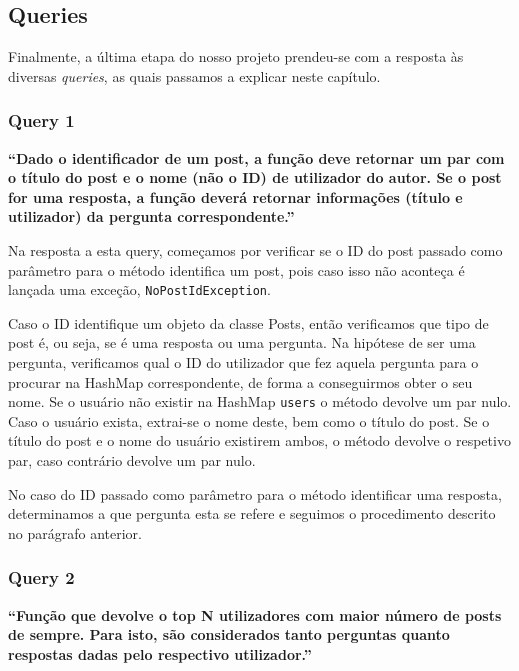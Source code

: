 \documentclass[a4paper]{article}
\begin{document}
\subsection{Queries}
\label{sec:queries}

Finalmente, a última etapa do nosso projeto prendeu-se com a resposta às diversas
\textit{queries}, as quais passamos a explicar neste capítulo.


\subsubsection*{Query 1}
\label{sec:query1}

\textbf{“Dado o identificador de um post, a função deve retornar
um par com o título do post e o nome (não o ID) de utilizador do autor. Se o post
for uma resposta, a função deverá retornar informações (título e utilizador)
da pergunta correspondente.”} \par

\vspace{0.1cm}

Na resposta a esta query, começamos por verificar se o ID do post passado como
parâmetro  para o método identifica um post, pois caso isso não aconteça é lançada
uma exceção, \texttt{NoPostIdException}. \par
Caso o ID identifique um objeto da classe Posts, então verificamos que tipo de post
é, ou seja, se é uma resposta ou uma pergunta.
Na hipótese de ser uma pergunta, verificamos qual o ID do utilizador que fez aquela
pergunta para o procurar na HashMap correspondente, de forma a conseguirmos obter
o seu nome. Se o usuário não existir na HashMap \texttt{users} o método devolve um
par nulo. Caso o usuário exista, extrai-se o nome deste, bem como o título do
post. Se o título do post e o nome do usuário existirem ambos, o método devolve o
respetivo par, caso contrário devolve um par nulo. \par
No caso do ID passado como parâmetro para o método identificar uma resposta,
determinamos a que pergunta esta se refere e seguimos o procedimento descrito
no parágrafo anterior.


\subsubsection*{Query 2}
\label{sec:query2}

\textbf{“Função que devolve o top N utilizadores com maior número
de posts de sempre. Para isto, são considerados tanto perguntas
quanto respostas dadas pelo respectivo utilizador.”}
\end{document}
